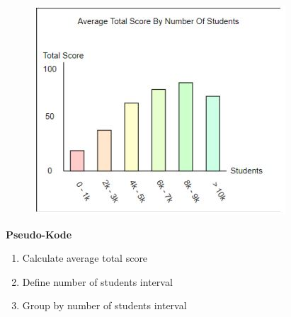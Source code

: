 \FigureCounter
\begin{figure}[H]
  \includegraphics[scale=1]{images/milepael4/averageScoreByStudents.JPG}
\end{figure}

\textbf{Pseudo-Kode}
\begin{enumerate}
  \item Calculate average total score
  \item Define number of students interval
  \item Group by number of students interval
\end{enumerate}
